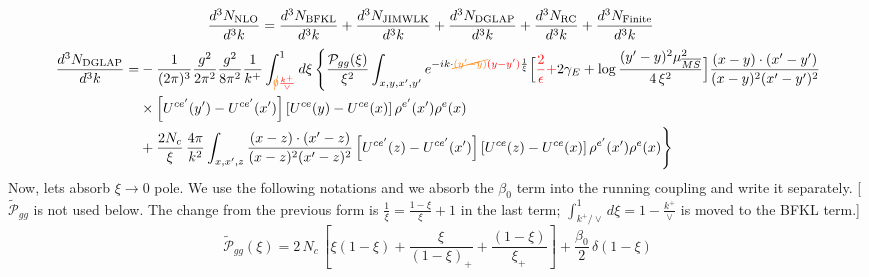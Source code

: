 \documentclass[9pt]{article}
\numberwithin{equation}{section}
\begin{document}
\begin{align}
    \frac{d^{3}N_{\rm NLO}}{d^{3}k} & = \frac{d^{3}N_{\rm BFKL}}{d^{3}k}+ \frac{d^{3}N_{\rm JIMWLK}}{d^{3}k}+\frac{d^{3}N_{\rm DGLAP}}{d^{3}k} + \frac{d^{3}N_{\rm RC}}{d^{3}k} + \frac{d^{3}N_{\rm Finite}}{d^{3}k}
\end{align}
\begin{align}
\frac{d^{3}N_{\rm DGLAP}}{d^{3}k}= &-\frac{1}{(2\pi)^{3}}\frac{g^{2}}{2\pi^{2}}\frac{g^{2}}{8\pi^{2}}\frac{1}{k^{+}}\int_{{\color{orange}\cancel{0}}{\color{red}\frac{k^{+}}{\vee}}}^{1}d\xi\,\Bigg\{\frac{\mathcal P_{gg}(\xi)}{\xi^{2}}\int_{x,y,x',y'}e^{-ik\cdot{\color{orange}\cancel{(y'-y)}}{\color{red}(y-y')}\frac{1}{\xi}}\Big[{\color{red}\frac{2}{\epsilon}+}2\gamma_{E}+\log\frac{(y'-y)^{2}\mu^{2}_{\overline{MS}}}{4\,\xi^{2}}\Big]\frac{(x-y)\cdot(x'-y')}{(x-y)^{2}(x'-y')^{2}}\notag\\
&\times\left[U^{ce'}(y') - U^{ce'}(x')\right]\left[U^{ce}(y) - U^{ce}(x)\right]\rho^{e'}(x')\rho^{e}(x)\notag\\
&+\frac{2N_{c}}{\xi}\,\frac{4\pi}{k^{2}}\int_{x,x',z}\frac{(x-z)\cdot(x'-z)}{(x-z)^{2}(x'-z)^{2}}\left[U^{ce'}(z) - U^{ce'}(x')\right]\left[U^{ce}(z) - U^{ce}(x)\right]\rho^{e'}(x')\rho^{e}(x)\Bigg\}
\end{align}
Now, lets absorb $\xi\to 0$ pole. We use the following notations and we absorb the $\beta_{0}$ term into the running coupling and write it separately. {\color{red}[$\widetilde{\mathcal{P}}_{gg}$ is not used below. The change from the previous form is $\frac{1}{\xi}=\frac{1-\xi}{\xi}+1$ in the last term; $\int_{k^{+}/\vee}^{1}d\xi=1-\frac{k^{+}}{\vee}$ is moved to the BFKL term.]}
$$\widetilde{\mathcal{P}}_{gg}(\xi) = 2\,N_{c}\,\left[\xi(1-\xi) + \frac{\xi}{(1-\xi)_{+}} + \frac{(1-\xi)}{\xi_{+}}\right]+\frac{\beta_{0}}{2}\,\delta(1-\xi) $$
\end{document}
